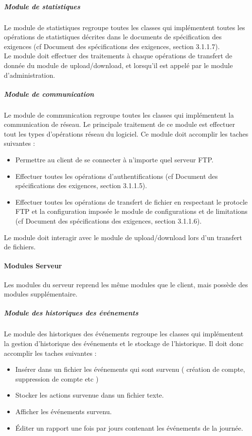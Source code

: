 \documentclass[10pt,a4paper]{report}
\begin{document}
				\subparagraph{Module de statistiques}
				\begin{flushleft}
				Le module de statistiques regroupe toutes les classes qui implémentent toutes les opérations de statistiques décrites dans le documents de  spécification des exigences (cf Document des spécifications des exigences, section 3.1.1.7).\\
				Le module doit effectuer des traitements à chaque opérations de transfert de donnée du module de upload/download, et lorsqu'il est appelé par le module d'administration.
				\end{flushleft}
				
	
				\subparagraph{Module de communication}
				\begin{flushleft}
				Le module de communication regroupe toutes les classes qui implémentent la communication de réseau. Le principale traitement de ce module est effectuer tout les types d'opérations réseau du logiciel. Ce module doit accomplir les taches suivantes :
				\begin{itemize}
					\item Permettre au client de se connecter à n'importe quel serveur FTP.
					\item Effectuer toutes les opérations d'authentifications (cf Document des spécifications des exigences, section 3.1.1.5).
					\item Effectuer toutes les opérations de transfert de fichier en respectant le protocle FTP et la configuration imposée le module de configurations et de limitations (cf Document des spécifications des exigences, section 3.1.1.6).
				\end{itemize}
				
				Le module doit interagir avec le module de upload/download lors d'un transfert de fichiers.\\
				\end{flushleft}
				
				
			\paragraph{Modules Serveur}
				Les modules du serveur reprend les même modules que le client, mais possède des modules supplémentaire. 
				
				\subparagraph{Module des historiques des événements}
				\begin{flushleft}
					Le module des historiques des événements regroupe les classes qui implémentent la gestion d'historique des événements et le stockage de l'historique. Il doit donc accomplir les taches suivantes : 
					\begin{itemize}
						\item Insérer dans un fichier les événements qui sont survenu ( création de compte, suppression de compte etc )
						\item Stocker les actions survenue dans un fichier texte.
						\item Afficher les événements survenu.
						\item Éditer un rapport une fois par jours contenant les événements de la journée.
					\end{itemize}
				\end{flushleft}
				
\end{document}
